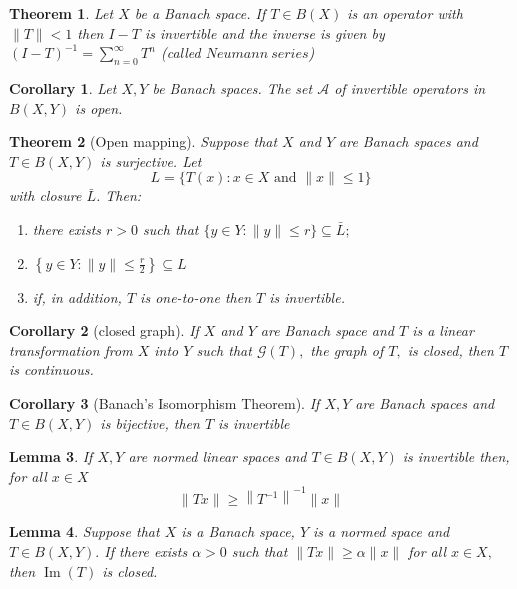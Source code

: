 \documentclass[10pt]{paper}
\newtheorem{theorem}{Theorem}[section]
\newtheorem{corollary}{Corollary}[section]
\newtheorem{lemma}[theorem]{Lemma}
\begin{document}
\begin{theorem}
    Let $X$ be a Banach space. If $T \in B(X)$ is an operator with $\|T\|<1$ then $I-T$ is invertible and the inverse is given by $(I-T)^{-1}=\sum_{n=0}^{\infty} T^{n}$ (called $Neumann \ series$)
\end{theorem}

\begin{corollary}
    Let $X, Y$ be Banach spaces. The set $\mathcal{A}$ of invertible operators in $B(X, Y)$ is open.
\end{corollary}

\begin{theorem}[Open mapping]
    Suppose that $X$ and $Y$ are Banach spaces and $T \in B(X, Y)$ is surjective. Let
    $$
        L=\{T(x): x \in X \text { and }\|x\| \leq 1\}
    $$
    with closure $\bar{L}$. Then:
    \begin{enumerate}
        \item there exists $r>0$ such that $\{y \in Y:\|y\| \leq r\} \subseteq \bar{L} ;$
        \item $\left\{y \in Y:\|y\| \leq \frac{r}{2}\right\} \subseteq L$
        \item if, in addition, $T$ is one-to-one then $T$ is invertible.
    \end{enumerate}
\end{theorem}

\begin{corollary}[closed graph]
    If $X$ and $Y$ are Banach space and $T$ is a linear transformation from $X$ into $Y$ such that $\mathcal{G}(T),$ the graph of $T,$ is closed, then $T$ is continuous.
\end{corollary}

\begin{corollary}[Banach's Isomorphism Theorem]
    If $X, Y$ are Banach spaces and $T \in B(X, Y)$ is bijective, then $T$ is invertible
\end{corollary}

\begin{lemma}
    If $X, Y$ are normed linear spaces and $T \in B(X, Y)$ is invertible then, for all $x \in X$
    $$
        \|T x\| \geq\left\|T^{-1}\right\|^{-1}\|x\|
    $$
\end{lemma}

\begin{lemma}
    Suppose that $X$ is a Banach space, $Y$ is a normed space and $T \in B(X, Y) .$ If there exists $\alpha>0$ such that $\|T x\| \geq \alpha\|x\|$ for all $x \in X,$ then $\operatorname{Im}(T)$ is closed.
\end{lemma}
\end{document}
